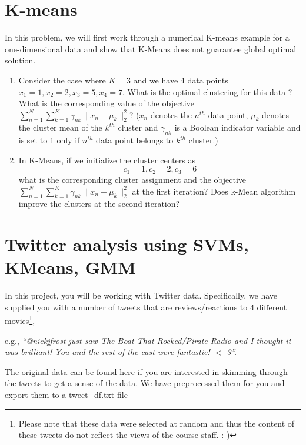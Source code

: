 \documentclass[11pt]{article}
\begin{document}
\section{K-means }
In this problem, we will first work through a numerical K-means example for a one-dimensional data and show that K-Means does not guarantee global optimal solution. 

\begin{enumerate}
\item \label{k1d1}  Consider the case where $K = 3$ and we have 4 data points $x_1 = 1, x_2 = 2, x_3 = 5, x_4 = 7$. What is the optimal clustering for this data ? What is the corresponding value of the objective $\sum_{n=1}^N \sum_{k=1}^{K}\gamma_{nk}\|x_n - \mu_k\|_2^2$?  ($x_n$ denotes the $n^{th}$ data point, $\mu_k$ denotes the cluster mean of the $k^{th}$ cluster and $\gamma_{nk}$ is a Boolean indicator variable and is set to 1 only if $n^{th}$ data point belongs to $k^{th}$ cluster.)\newline
\solution{}

\item \label{k1d2}  In K-Means, if we initialize the cluster centers as $$c_1=1,c_2=2,c_3=6$$ what is the corresponding cluster assignment and the objective $\sum_{n=1}^N \sum_{k=1}^{K}\gamma_{nk}\|x_n - \mu_k\|_2^2$ at the first iteration? Does k-Mean algorithm improve the clusters at the second iteration? \newline
\solution{}
\end{enumerate}


\section{Twitter analysis using SVMs, KMeans, GMM }\label{sec:intro}

In this project, you will be working with Twitter data. Specifically, we have supplied you with a number of tweets that are reviews/reactions to 4 different movies\footnote{Please note that these data were selected at random and thus the content of these tweets do not reflect the views of the course staff. :-)},

e.g., \textit{``@nickjfrost just saw The Boat That Rocked/Pirate Radio and I thought it was brilliant! You and the rest of the cast were fantastic! $<$ 3''.}


The original data can be found \href{https://drive.google.com/file/d/118i544Dxn9LHPeCoaPe4rwXfWGiRXeyh/view?usp=sharing}{here}  if you are interested in skimming through the tweets to get a sense of the data. We have preprocessed them for you and export them to a \href{https://drive.google.com/file/d/1peuPuSMEmy9DT2hpAYBWj1srur_OkcVq/view?usp=sharing}{tweet\_df.txt} file
\end{document}
